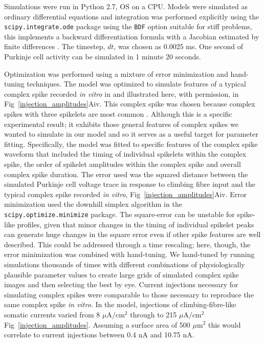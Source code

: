 \documentclass[utf8]{frontiersSCNS} %
\begin{document}
Simulations were run in Python 2.7, OS on a CPU. Models were simulated as ordinary differential equations and integration was performed explicitly using the \texttt{scipy.integrate.ode} package using the \texttt{BDF} option suitable for stiff problems, this implements a backward differentiation formula with a Jacobian estimated by finite differences \cite{ByrneHindmarsh1975}. The timestep, $dt$, was chosen as 0.0025 ms. One second of Purkinje cell activity can be simulated in 1 minute 20 seconds. 

Optimization was performed using a mixture of error minimization and hand-tuning techniques. The model was optimized to simulate features of a typical complex spike recorded \textit{in vitro} in \cite{DavieEtAl2008} and illustrated here, with permission, in Fig~\ref{injection_amplitudes}Aiv. This complex spike was chosen because complex spikes with three spikelets are most common \cite{BurroughsEtAl2016}. Although this is a specific experimental result; it exhibits those general features of complex spikes we wanted to simulate in our model and so it serves as a useful target for parameter fitting. Specifically, the model was fitted to specific features of the complex spike waveform that included the timing of individual spikelets within the complex spike, the order of spikelet amplitudes within the complex spike and overall complex spike duration. The error used was the squared distance between the simulated Purkinje cell voltage trace in response to climbing fibre input and the typical complex spike recorded \textit{in vitro}, Fig~\ref{injection_amplitudes}Aiv. Error minimization used the downhill simplex algorithm in the \texttt{scipy.optimize.minimize} package. The square-error can be unstable for spike-like profiles, given that minor changes in the timing of individual spikelet peaks can generate huge changes in the square error even if other spike features are well described. This could be addressed through a time rescaling; here, though, the error minimization was combined with hand-tuning. We hand-tuned by running simulations thousands of times with different combinations of physiologically plausible parameter values to create large grids of simulated complex spike images and then selecting the best by eye. Current injections necessary for simulating complex spikes were comparable to those necessary to reproduce the same complex spike \textit{in vitro}. In the model, injections of climbing-fibre-like somatic currents varied from 8 $\mu$A$/$cm$^2$ through to 215 $\mu$A$/$cm$^2$ Fig~\ref{injection_amplitudes}. Assuming a surface area of 500 $\mu$m$^2$ this would correlate to current injections between 0.4 nA and 10.75 nA.
\end{document}
